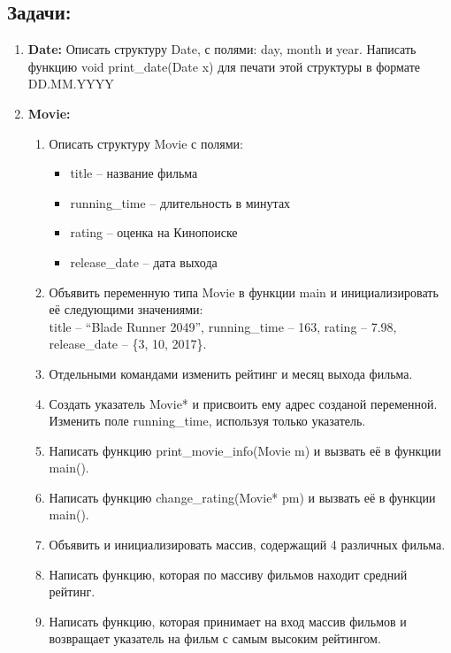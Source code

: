 \documentclass{article}
\begin{document}
\subsection*{Задачи:}
\begin{enumerate}
\item \textbf{Date:} Описать структуру Date, с полями: day, month и year. Написать функцию void print\_date(Date x) для печати этой структуры в формате DD.MM.YYYY
\item \textbf{Movie:}
\begin{enumerate}
\item Описать структуру Movie с полями: 
\begin{itemize}
\item title -- название фильма
\item running\_time -- длительность в минутах
\item rating -- оценка на Кинопоиске
\item release\_date -- дата выхода
\end{itemize}
\item Объявить переменную типа Movie в функции main и инициализировать её следующими значениями:\\
title -- ``Blade Runner 2049'', running\_time -- 163, rating -- 7.98, release\_date -- \{3, 10, 2017\}.
\item Отдельными командами изменить рейтинг и месяц выхода фильма.
\item Создать указатель Movie* и присвоить ему адрес созданой переменной.  Изменить поле running\_time, используя только указатель.
\item Написать функцию print\_movie\_info(Movie m) и вызвать её в функции main().
\item Написать функцию change\_rating(Movie* pm) и вызвать её в функции main().
\item Объявить и инициализировать массив, содержащий 4 различных фильма.
\item Написать функцию, которая по массиву фильмов находит средний рейтинг.
\item Написать функцию, которая принимает на вход массив фильмов и возвращает указатель на фильм с самым высоким рейтингом.
\end{enumerate}
\end{enumerate}
\end{document}
